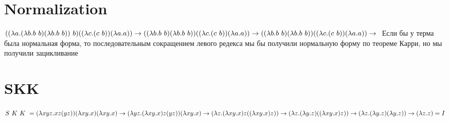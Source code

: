 \documentclass{article}
\begin{document}
\section{Normalization}
$((\lambda a.(\lambda b.b \ b)(\lambda b.b \ b))\ b)((\lambda c.(c \ b))(\lambda a.a)) \to \\ 
((\lambda b.b \ b)(\lambda b.b \ b)) ((\lambda c.(c \ b))(\lambda a.a)) \to \\
((\lambda b.b \ b)(\lambda b.b \ b)) ((\lambda c.(c \ b))(\lambda a.a)) \to \\$
Если бы у терма была нормальная форма, то последовательным сокращением левого редекса мы бы получили нормальную форму по теореме Карри, но мы получили зацикливание
\section{SKK}
$
S \ K \ K \ = \\
(\lambda xyz.xz(yz))(\lambda xy. x)(\lambda xy.x)
\to \\ 
(\lambda yz.(\lambda xy.x)z(yz))(\lambda xy.x)
\to \\
(\lambda z.(\lambda xy.x)z((\lambda xy.x)z))
\to \\
(\lambda z.(\lambda y.z)((\lambda xy.x)z))
\to \\
(\lambda z.(\lambda y.z)(\lambda y.z))
\to \\
(\lambda z.z) = I
$
\end{document}

